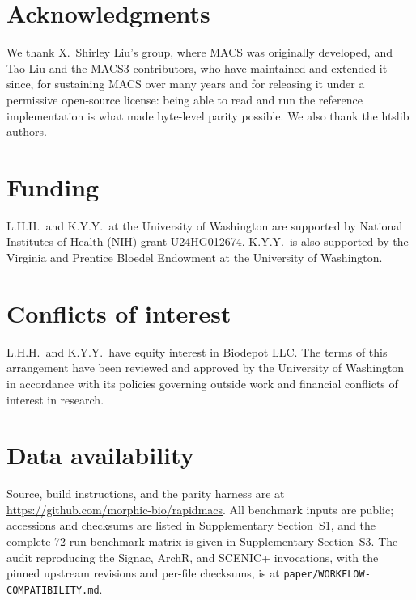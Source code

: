 \documentclass[namedate,webpdf,contemporary,large]{oup-authoring-template}
\begin{document}
\section{Acknowledgments}
We thank X.~Shirley Liu's group, where MACS was originally developed, and Tao Liu and the MACS3 contributors, who have maintained and extended it since, for sustaining MACS over many years and for releasing it under a permissive open-source license: being able to read and run the reference implementation is what made byte-level parity possible. We also thank the htslib authors.

\section{Funding}
L.H.H.\ and K.Y.Y.\ at the University of Washington are supported by National Institutes of Health (NIH) grant U24HG012674. K.Y.Y.\ is also supported by the Virginia and Prentice Bloedel Endowment at the University of Washington.

\section{Conflicts of interest}
L.H.H.\ and K.Y.Y.\ have equity interest in Biodepot LLC. The terms of this arrangement have been reviewed and approved by the University of Washington in accordance with its policies governing outside work and financial conflicts of interest in research.

\section{Data availability}
Source, build instructions, and the parity harness are at \url{https://github.com/morphic-bio/rapidmacs}. All benchmark inputs are public; accessions and checksums are listed in Supplementary Section~S1, and the complete 72-run benchmark matrix is given in Supplementary Section~S3. The audit reproducing the Signac, ArchR, and SCENIC+ invocations, with the pinned upstream revisions and per-file checksums, is at \texttt{paper/\allowbreak WORKFLOW-\allowbreak COMPATIBILITY.md}.

\setlength{\bibsep}{0pt plus 0.3ex}


\end{document}
